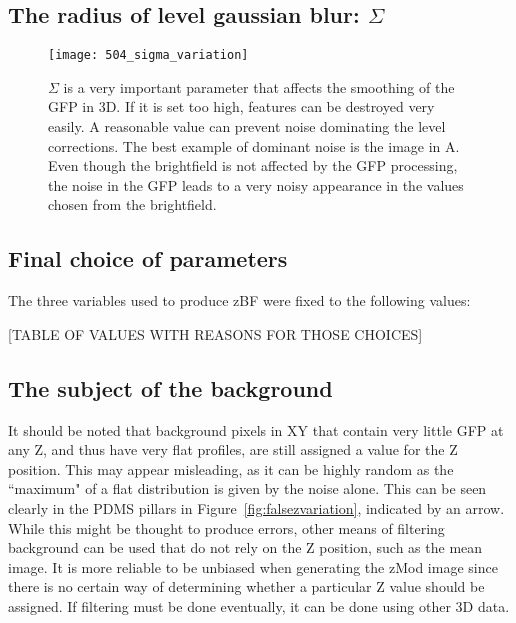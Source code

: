 \subsection{The radius of level gaussian blur: $\Sigma$}

\begin{figure}[h!]
 \centering
 \texttt{[image: 504\_sigma\_variation]}
 \caption[Varying $\Sigma$]{
 	$\Sigma$ is a very important parameter that affects the smoothing of the GFP in 3D. If it is set too high, features can be destroyed very easily. A reasonable value can prevent noise dominating the level corrections. The best example of dominant noise is the image in A. Even though the brightfield is not affected by the GFP processing, the noise in the GFP leads to a very noisy appearance in the values chosen from the brightfield.
 }
 \label{fig:sigmavariation}
\end{figure}

\subsection{Final choice of parameters}

The three variables used to produce zBF were fixed to the following values:

[TABLE OF VALUES WITH REASONS FOR THOSE CHOICES]

\subsection{The subject of the background}

It should be noted that background pixels in XY that contain very little GFP at any Z, and thus have very flat profiles, are still assigned a value for the Z position. This may appear misleading, as it can be highly random as the ``maximum" of a flat distribution is given by the noise alone. This can be seen clearly in the PDMS pillars in Figure~\ref{fig:falsezvariation}, indicated by an arrow. While this might be thought to produce errors, other means of filtering background can be used that do not rely on the Z position, such as the mean image. It is more reliable to be unbiased when generating the zMod image since there is no certain way of determining whether a particular Z value should be assigned. If filtering must be done eventually, it can be done using other 3D data.

